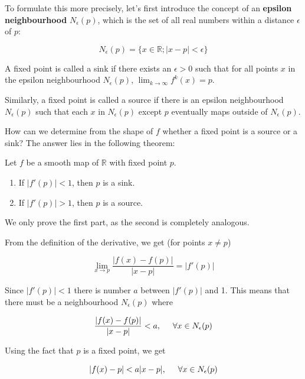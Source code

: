 To formulate this more precisely, let's first introduce the concept of an \textbf{epsilon neighbourhood} $N_\epsilon(p)$, which is the set of all real numbers within a distance $\epsilon$ of $p$:

\begin{equation}
N_\epsilon(p) = \{x \in \mathbb{R} ; |x-p| < \epsilon\}
\end{equation} 

A fixed point is called a sink if there exists an $\epsilon > 0$ such that for all points $x$ in the epsilon neighbourhood $N_\epsilon(p)$, $\lim_{k \to \infty} f^k(x) = p$.

Similarly, a fixed point is called a source if there is an epsilon neighbourhood $N_\epsilon(p)$ such that each $x$ in $N_\epsilon(p)$ except $p$ eventually maps outside of $N_\epsilon(p)$.

How can we determine from the shape of $f$ whether a fixed point is a source or a sink? The answer lies in the following theorem:

Let $f$ be a smooth map of $\mathbb{R}$ with fixed point $p$. 
\begin{enumerate}
\item
If $|f'(p)| < 1$, then $p$ is a sink.
\item 
If $|f'(p)| > 1$, then $p$ is a source. 
\end{enumerate}


We only prove the first part, as the second is completely analogous.

From the definition of the derivative, we get (for points $x \ne p$)

\begin{equation}
\lim_{x \to p} \frac{\left|f(x)-f(p)\right|}{|x-p|} = \left|f'(p)\right|
\end{equation} 

Since $|f'(p)| < 1$ there is number $a$ between $|f'(p)|$ and 1. This means that there must be a neighbourhood $N_\epsilon(p)$ where

\begin{equation}
\frac{\left|f(x)-f(p)\right|}{|x-p|} < a, \hspace{.5cm} \forall x \in N_\epsilon(p)
\end{equation}

Using the fact that $p$ is a fixed point, we get

\begin{equation}
\left|f(x)-p\right| < a |x-p|,  \hspace{.5cm} \forall x \in N_\epsilon(p) \label{eq-stab-fix}
\end{equation}

